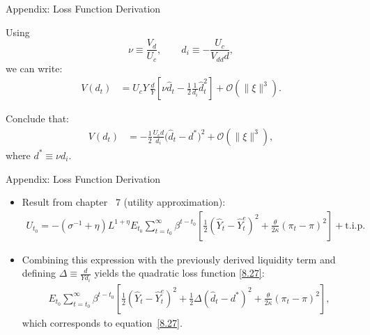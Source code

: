 \documentclass[11pt,aspectratio=169]{beamer}
\begin{document}
\begin{frame}{Appendix: Loss Function Derivation}

Using
\[
\nu \equiv \frac{V_d}{U_c},
\qquad
d_i \equiv -\frac{U_c}{V_{dd} d},
\]
we can write:
\begin{align*}
V(d_t)
&= U_c Y\,\frac{d}{Y}
\left[
\nu \hat d_t
- \tfrac12 \frac{1}{d_i}\hat d_t^2
\right]
+ \mathcal{O}(\|\xi\|^3).
\end{align*}

Conclude that:
\begin{align*}
V(d_t)
&=
-\tfrac12 \frac{U_c d}{d_i}
\big(\hat d_t - d^*\big)^2
+ \mathcal{O}(\|\xi\|^3),
\end{align*}
where $d^* \equiv \nu d_i$.
\end{frame}

\begin{frame}{Appendix: Loss Function Derivation}

\begin{itemize}
  \item Result from chapter ~7 (utility approximation):
  \begin{align*}
    U_{t_0}
    = -(\sigma^{-1}+\eta)L^{1+\eta}
    E_{t_0}\sum_{t=t_0}^{\infty}\beta^{t-t_0}
    \left[
      \frac{1}{2}(\hat Y_t - \hat Y_t^e)^2
      + \frac{\theta}{2\kappa}(\pi_t - \pi)^2
    \right]
    + \text{t.i.p.}
  \end{align*}
    \item Combining this expression with the previously derived liquidity term and defining $\Delta \equiv \frac{d}{Y d_i}$ yields the quadratic loss function \eqref{8.27}:
  \begin{align*}
    E_{t_0}\sum_{t=t_0}^{\infty}\beta^{t-t_0}
    \left[
      \frac{1}{2}(\hat Y_t - \hat Y_t^e)^2
      + \frac{1}{2}\Delta(\hat d_t - d^*)^2
      + \frac{\theta}{2\kappa}(\pi_t - \pi)^2
    \right],
  \end{align*}
  which corresponds to equation~\eqref{8.27}.
\end{itemize}
\vspace{0.1cm}
\begin{center}
\hyperlink{Loss Function}{}
\end{center}
\end{frame}
\end{document}

